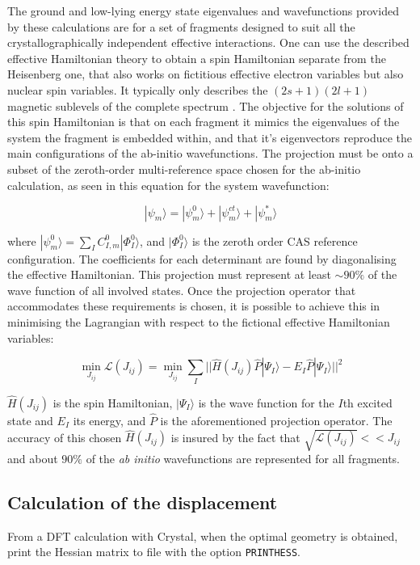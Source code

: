 \documentclass[10pt]{article}
\begin{document}
The ground and low-lying energy state eigenvalues and wavefunctions provided by these calculations are for a set of fragments designed to suit all the crystallographically independent effective interactions. One can use the described effective Hamiltonian theory to obtain a spin Hamiltonian separate from the Heisenberg one, that also works on fictitious effective electron variables but also nuclear spin variables. It typically only describes the $(2s+1)(2l+1)$ magnetic sublevels of the complete spectrum \cite{mostafanejad2014basics}. The objective for the solutions of this spin Hamiltonian is that on each fragment it mimics the eigenvalues of the system the fragment is embedded within, and that it's eigenvectors reproduce the main configurations of the ab-initio wavefunctions. The projection must be onto a subset of the zeroth-order multi-reference space chosen for the ab-initio calculation, as seen in this equation for the system wavefunction\cite{gelle2009accurate}:

\begin{equation*}
	|\psi_m\rangle = |\psi^0_m\rangle + |\psi^{ct}_m\rangle + |\psi^*_m\rangle
\end{equation*}

where $|\psi^0_m\rangle = \sum_{I}C^0_{I,m}|\Phi^0_I\rangle$, and $|\Phi^0_I\rangle$ is the zeroth order CAS reference configuration. The coefficients for each determinant are found by diagonalising the effective Hamiltonian. This projection must represent at least $\sim90\%$ of the wave function of all involved states. Once the projection operator that accommodates these requirements is chosen, it is possible to achieve this in minimising the Lagrangian with respect to the fictional effective Hamiltonian variables:

\begin{equation*}
	\min_{J_{ij}} \mathcal{L}(J_{ij}) = \min_{J_{ij}} \sum_I ||\hat{H}(J_{ij})\hat{P}|\Psi_I\rangle-E_I\hat{P}|\Psi_I\rangle||^2
\end{equation*}

$\hat{H}(J_{ij})$ is the spin Hamiltonian, $|\Psi_I\rangle$ is the wave function for the $I$th excited state and $E_I$ its energy, and $\hat{P}$ is the aforementioned projection operator. The accuracy of this chosen $\hat{H}(J_{ij})$ is insured by the fact that $\sqrt{\mathcal{L}(J_{ij})} << J_{ij}$ and about $90\%$ of the \textit{ab initio} wavefunctions are represented for all fragments. 

\subsection{Calculation of the displacement}
From a DFT calculation with Crystal, when the optimal geometry is obtained, print the Hessian matrix to file with the option \verb|PRINTHESS|.
\end{document}
